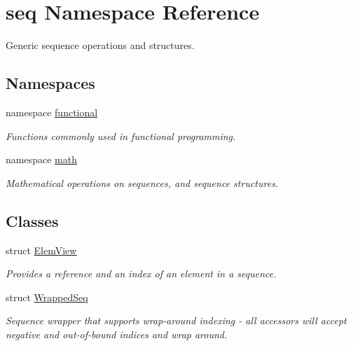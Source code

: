 \hypertarget{namespaceseq}{\section{seq Namespace Reference}
\label{namespaceseq}
}


Generic sequence operations and structures.  


\subsection*{Namespaces}
\begin{DoxyCompactItemize}
\item 
namespace \hyperlink{namespaceseq_1_1functional}{functional}
\begin{DoxyCompactList}\small\item\em Functions commonly used in functional programming. \end{DoxyCompactList}\item 
namespace \hyperlink{namespaceseq_1_1math}{math}
\begin{DoxyCompactList}\small\item\em Mathematical operations on sequences, and sequence structures. \end{DoxyCompactList}\end{DoxyCompactItemize}
\subsection*{Classes}
\begin{DoxyCompactItemize}
\item 
struct \hyperlink{structseq_1_1_elem_view}{Elem\-View}
\begin{DoxyCompactList}\small\item\em Provides a reference and an index of an element in a sequence. \end{DoxyCompactList}\item 
struct \hyperlink{structseq_1_1_wrapped_seq}{Wrapped\-Seq}
\begin{DoxyCompactList}\small\item\em Sequence wrapper that supports wrap-\/around indexing -\/ all accessors will accept negative and out-\/of-\/bound indices and wrap around. \end{DoxyCompactList}\end{DoxyCompactItemize}
